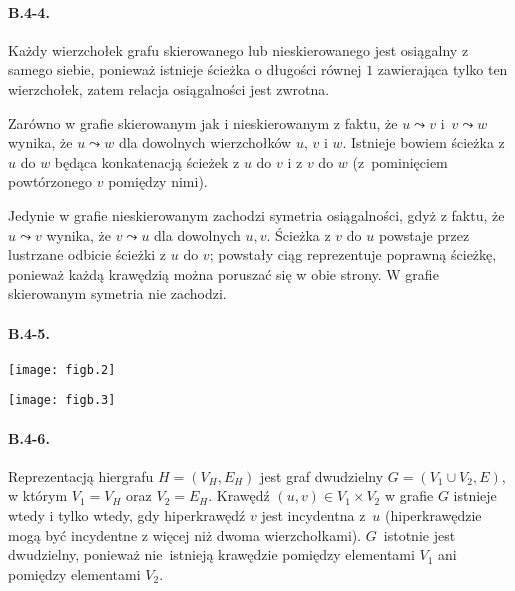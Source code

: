 \paragraph{B.4-4.}
Każdy wierzchołek grafu skierowanego lub nieskierowanego jest osiągalny z samego siebie, ponieważ istnieje ścieżka o długości równej $1$ zawierająca tylko ten wierzchołek, zatem relacja osiągalności jest zwrotna.

Zarówno w grafie skierowanym jak i nieskierowanym z faktu, że $u\leadsto v$ i~$v\leadsto w$ wynika, że $u\leadsto w$ dla dowolnych wierzchołków $u$, $v$ i $w$. Istnieje bowiem ścieżka z $u$ do $w$ będąca konkatenacją ścieżek z $u$ do $v$ i z $v$ do $w$ (z~pominięciem powtórzonego $v$ pomiędzy nimi).

Jedynie w grafie nieskierowanym zachodzi symetria osiągalności, gdyż z faktu, że $u\leadsto v$ wynika, że $v\leadsto u$ dla dowolnych $u,v$. Ścieżka z $v$ do $u$ powstaje przez lustrzane odbicie ścieżki z $u$ do $v$; powstały ciąg reprezentuje poprawną ścieżkę, ponieważ każdą krawędzią można poruszać się w obie strony. W grafie skierowanym symetria nie zachodzi.

\paragraph{B.4-5.}
	\begin{center}
		\texttt{[image: figb.2]}
	\end{center}
	\begin{center}
		\texttt{[image: figb.3]}
	\end{center}

\paragraph{B.4-6.}
Reprezentacją hiergrafu $H=(V_H,E_H)$ jest graf dwudzielny $G=(V_1\cup V_2,E)$, w którym $V_1=V_H$ oraz $V_2=E_H$. Krawędź $(u,v)\in V_1\times V_2$ w grafie $G$ istnieje wtedy i tylko wtedy, gdy hiperkrawędź $v$ jest incydentna z~$u$ (hiperkrawędzie mogą być incydentne z więcej niż dwoma wierzchołkami). $G$~istotnie jest dwudzielny, ponieważ nie~istnieją krawędzie pomiędzy elementami $V_1$ ani pomiędzy elementami $V_2$.

